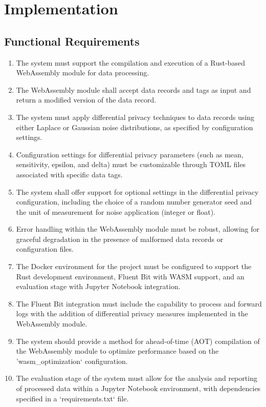 \chapter{Implementation\label{chap:implementation}}
\section{Functional Requirements}

\begin{enumerate}
    \item The system must support the compilation and execution of a Rust-based WebAssembly module for data processing.
    \item The WebAssembly module shall accept data records and tags as input and return a modified version of the data record.
    \item The system must apply differential privacy techniques to data records using either Laplace or Gaussian noise distributions, as specified by configuration settings.
    \item Configuration settings for differential privacy parameters (such as mean, sensitivity, epsilon, and delta) must be customizable through TOML files associated with specific data tags.
    \item The system shall offer support for optional settings in the differential privacy configuration, including the choice of a random number generator seed and the unit of measurement for noise application (integer or float).
    \item Error handling within the WebAssembly module must be robust, allowing for graceful degradation in the presence of malformed data records or configuration files.
    \item The Docker environment for the project must be configured to support the Rust development environment, Fluent Bit with WASM support, and an evaluation stage with Jupyter Notebook integration.
    \item The Fluent Bit integration must include the capability to process and forward logs with the addition of differential privacy measures implemented in the WebAssembly module.
    \item The system should provide a method for ahead-of-time (AOT) compilation of the WebAssembly module to optimize performance based on the 'wasm\_optimization` configuration.
    \item The evaluation stage of the system must allow for the analysis and reporting of processed data within a Jupyter Notebook environment, with dependencies specified in a `requirements.txt` file.
\end{enumerate}

